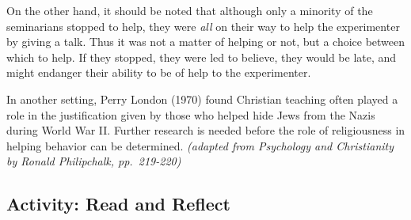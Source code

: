 \documentclass[
]{book}
\begin{document}
On the other hand, it should be noted that although only a minority of the seminarians stopped to help, they were \emph{all} on their way to help the experimenter by giving a talk. Thus it was not a matter of helping or not, but a choice between which to help. If they stopped, they were led to believe, they would be late, and might endanger their ability to be of help to the experimenter.

In another setting, Perry London (1970) found Christian teaching often played a role in the justification given by those who helped hide Jews from the Nazis during World War II. Further research is needed before the role of religiousness in helping behavior can be determined. \emph{(adapted from Psychology and Christianity by Ronald Philipchalk, pp.~219-220)}

\hypertarget{activity-read-and-reflect-10}{%
\subsection*{Activity: Read and Reflect}\label{activity-read-and-reflect-10}}
\end{document}
